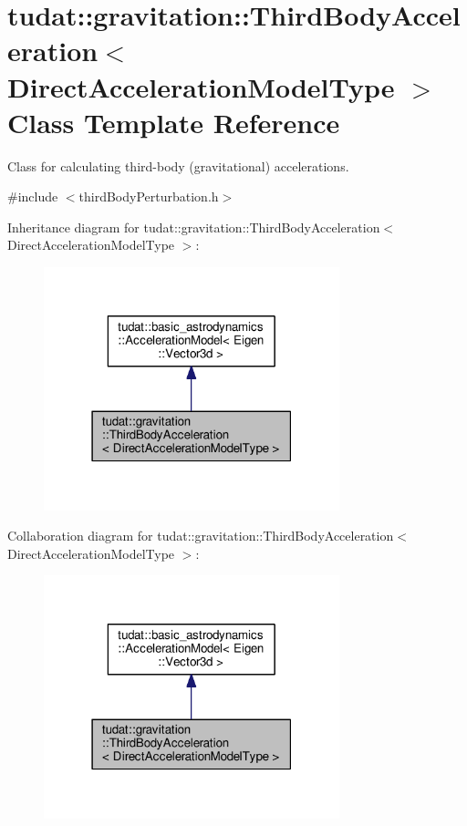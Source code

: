 \hypertarget{classtudat_1_1gravitation_1_1ThirdBodyAcceleration}{}\section{tudat\+:\+:gravitation\+:\+:Third\+Body\+Acceleration$<$ Direct\+Acceleration\+Model\+Type $>$ Class Template Reference}
\label{classtudat_1_1gravitation_1_1ThirdBodyAcceleration}


Class for calculating third-\/body (gravitational) accelerations.  




{\ttfamily \#include $<$third\+Body\+Perturbation.\+h$>$}



Inheritance diagram for tudat\+:\+:gravitation\+:\+:Third\+Body\+Acceleration$<$ Direct\+Acceleration\+Model\+Type $>$\+:
\nopagebreak
\begin{figure}[H]
\begin{center}
\leavevmode
\includegraphics[width=243pt]{classtudat_1_1gravitation_1_1ThirdBodyAcceleration__inherit__graph}
\end{center}
\end{figure}


Collaboration diagram for tudat\+:\+:gravitation\+:\+:Third\+Body\+Acceleration$<$ Direct\+Acceleration\+Model\+Type $>$\+:
\nopagebreak
\begin{figure}[H]
\begin{center}
\leavevmode
\includegraphics[width=243pt]{classtudat_1_1gravitation_1_1ThirdBodyAcceleration__coll__graph}
\end{center}
\end{figure}
